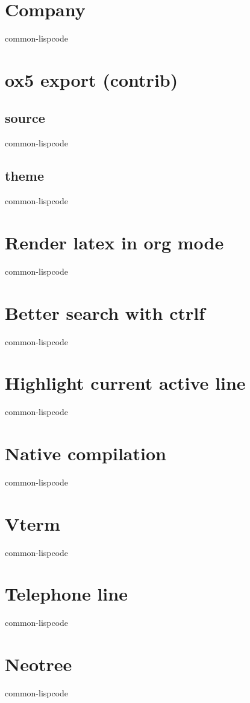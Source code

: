 \documentclass[11pt]{article}
\begin{document}
\section{Company}
\label{sec:org6198ff8}
common-lispcode
\section{ox5 export (contrib)}
\label{sec:orgcb0900a}
\subsection{source}
\label{sec:orgafa11ab}
common-lispcode
\subsection{theme}
\label{sec:org88bad01}
common-lispcode
\section{Render latex in org mode}
\label{sec:orge18b200}
common-lispcode
\section{Better search with ctrlf}
\label{sec:orgc3e3e26}
common-lispcode
\section{Highlight current active line}
\label{sec:org0a9e10c}
common-lispcode
\section{Native compilation}
\label{sec:org251b850}
common-lispcode
\section{Vterm}
\label{sec:org87afefc}
common-lispcode
\section{Telephone line}
\label{sec:org3a26a59}
common-lispcode
\section{Neotree}
\label{sec:org8bda667}
common-lispcode
\end{document}
